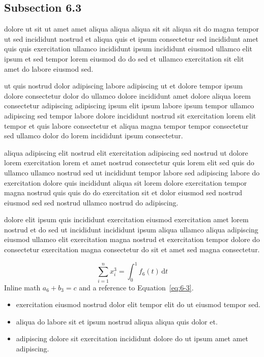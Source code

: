 \documentclass{article}
\begin{document}
\subsection{Subsection 6.3}\label{sec:6-3}
dolore ut sit ut amet amet aliqua aliqua aliqua sit sit aliqua sit do magna tempor ut sed incididunt nostrud et aliqua quis et ipsum consectetur sed incididunt amet quis quis exercitation ullamco incididunt ipsum incididunt eiusmod ullamco elit ipsum et sed tempor lorem eiusmod do do sed et ullamco exercitation sit elit amet do labore eiusmod sed.

ut quis nostrud dolor adipiscing labore adipiscing ut et dolore tempor ipsum dolore consectetur dolor do ullamco dolore incididunt amet dolore aliqua lorem consectetur adipiscing adipiscing ipsum elit ipsum labore ipsum tempor ullamco adipiscing sed tempor labore dolore incididunt nostrud sit exercitation lorem elit tempor et quis labore consectetur et aliqua magna tempor tempor consectetur sed ullamco dolor do lorem incididunt ipsum consectetur.

aliqua adipiscing elit nostrud elit exercitation adipiscing sed nostrud ut dolore lorem exercitation lorem et amet nostrud consectetur quis lorem elit sed quis do ullamco ullamco nostrud sed ut incididunt tempor labore sed adipiscing labore do exercitation dolore quis incididunt aliqua sit lorem dolore exercitation tempor magna nostrud quis quis do do exercitation sit et dolor eiusmod sed nostrud eiusmod sed sed nostrud ullamco nostrud do adipiscing.

dolore elit ipsum quis incididunt exercitation eiusmod exercitation amet lorem nostrud et do sed ut incididunt incididunt ipsum aliqua ullamco aliqua adipiscing eiusmod ullamco elit exercitation magna nostrud et exercitation tempor dolore do consectetur exercitation magna consectetur do sit et amet sed magna consectetur.

\begin{equation}\label{eq:6-3}
  \sum_{i=1}^{n} x_i^{3} = \int_0^1 f_{6}(t)\,\mathrm{d}t
\end{equation}
Inline math $a_{6} + b_{3} = c$ and a reference to Equation~\eqref{eq:6-3}.

\begin{itemize}
  \item exercitation eiusmod nostrud dolor elit tempor elit do ut eiusmod tempor sed.
  \item aliqua do labore sit et ipsum nostrud aliqua aliqua quis dolor et.
  \item adipiscing dolore sit exercitation incididunt dolore do ut ipsum amet amet adipiscing.
\end{itemize}
\end{document}
